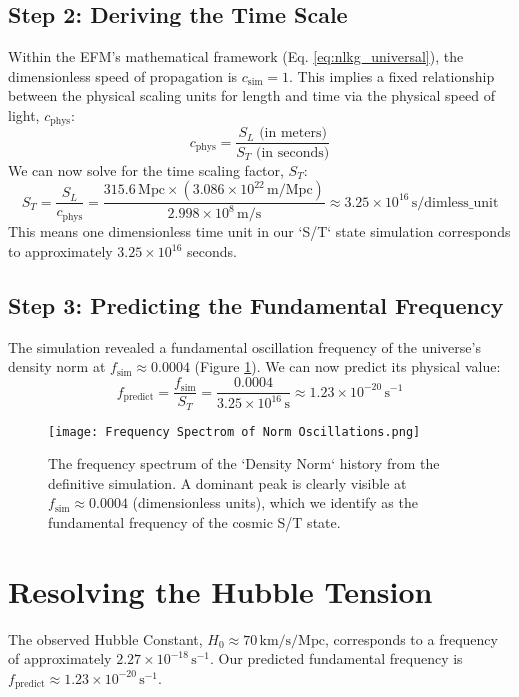 \documentclass[11pt]{article}
\begin{document}
\subsection{Step 2: Deriving the Time Scale}
Within the EFM's mathematical framework (Eq. \ref{eq:nlkg_universal}), the dimensionless speed of propagation is \(c_{\text{sim}}=1\). This implies a fixed relationship between the physical scaling units for length and time via the physical speed of light, \(c_{\text{phys}}\):
\begin{equation}
c_{\text{phys}} = \frac{S_L \text{ (in meters)}}{S_T \text{ (in seconds)}}
\end{equation}
We can now solve for the time scaling factor, \(S_T\):
\begin{equation}
S_T = \frac{S_L}{c_{\text{phys}}} = \frac{315.6 \, \text{Mpc} \times (3.086 \times 10^{22} \, \text{m/Mpc})}{2.998 \times 10^8 \, \text{m/s}} \approx 3.25 \times 10^{16} \, \text{s/dimless\_unit}
\end{equation}
This means one dimensionless time unit in our `S/T` state simulation corresponds to approximately \(3.25 \times 10^{16}\) seconds.

\subsection{Step 3: Predicting the Fundamental Frequency}
The simulation revealed a fundamental oscillation frequency of the universe's density norm at \(f_{\text{sim}} \approx 0.0004\) (Figure \ref{fig:frequency_spectrum}). We can now predict its physical value:
\begin{equation}
f_{\text{predict}} = \frac{f_{\text{sim}}}{S_T} = \frac{0.0004}{3.25 \times 10^{16} \, \text{s}} \approx 1.23 \times 10^{-20} \, \text{s}^{-1}
\end{equation}

\begin{figure}[h!]
\centering
\texttt{[image: Frequency Spectrom of Norm Oscillations.png]}
\caption{The frequency spectrum of the `Density Norm` history from the definitive simulation. A dominant peak is clearly visible at \(f_{\text{sim}} \approx 0.0004\) (dimensionless units), which we identify as the fundamental frequency of the cosmic S/T state.}
\label{fig:frequency_spectrum}
\end{figure}

\section{Resolving the Hubble Tension}
The observed Hubble Constant, \(H_0 \approx 70 \, \text{km/s/Mpc}\), corresponds to a frequency of approximately \(2.27 \times 10^{-18} \, \text{s}^{-1}\). Our predicted fundamental frequency is \(f_{\text{predict}} \approx 1.23 \times 10^{-20} \, \text{s}^{-1}\).
\end{document}
